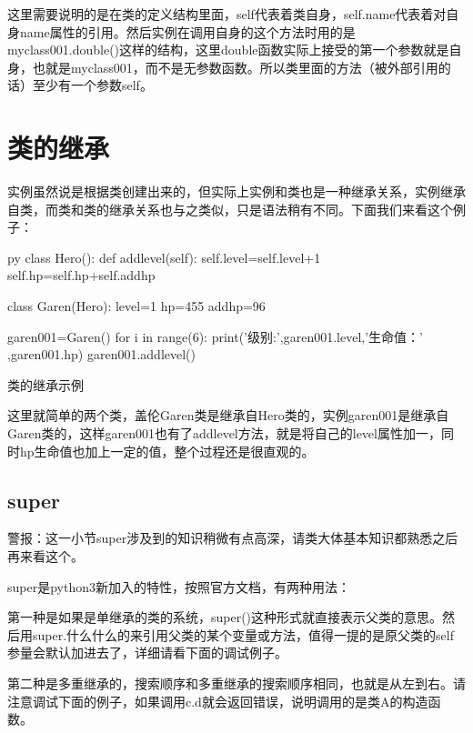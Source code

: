 \documentclass[12pt,oneside]{book}
\begin{document}
\begin{common-format}
这里需要说明的是在类的定义结构里面，self代表着类自身，self.name代表着对自身name属性的引用。然后实例在调用自身的这个方法时用的是myclass001.double()这样的结构，这里double函数实际上接受的第一个参数就是自身，也就是myclass001，而不是无参数函数。所以类里面的方法（被外部引用的话）至少有一个参数self。





\section{类的继承}
实例虽然说是根据类创建出来的，但实际上实例和类也是一种继承关系，实例继承自类，而类和类的继承关系也与之类似，只是语法稍有不同。下面我们来看这个例子：
\begin{xverbatim}[129]{py}
class Hero():
    def addlevel(self):
        self.level=self.level+1
        self.hp=self.hp+self.addhp

class Garen(Hero):
    level=1
    hp=455
    addhp=96

garen001=Garen()
for i in range(6):
    print('级别:',garen001.level,'生命值：' ,garen001.hp)
    garen001.addlevel()
\end{xverbatim}

\begin{fig}[0.5]{类的继承示例}
\caption{类的继承示例}
\label{fig:类的继承示例}
\end{fig}

这里就简单的两个类，盖伦Garen类是继承自Hero类的，实例garen001是继承自Garen类的，这样garen001也有了addlevel方法，就是将自己的level属性加一，同时hp生命值也加上一定的值，整个过程还是很直观的。

\subsection{super}
\begin{flushright}
\begin{notecard}[red!30]{16em}
警报：这一小节super涉及到的知识稍微有点高深，请类大体基本知识都熟悉之后再来看这个。 
\end{notecard}
\end{flushright}

super是python3新加入的特性，按照官方文档，有两种用法：

第一种是如果是单继承的类的系统，super()这种形式就直接表示父类的意思。然后用super.什么什么的来引用父类的某个变量或方法，值得一提的是原父类的self参量会默认加进去了，详细请看下面的调试例子。

第二种是多重继承的，搜索顺序和多重继承的搜索顺序相同，也就是从左到右。请注意调试下面的例子，如果调用c.d就会返回错误，说明调用的是类A的构造函数。


\end{common-format}
\end{document}
